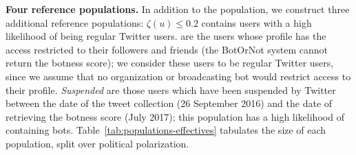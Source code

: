 

\textbf{Four reference populations.}
In addition to the \Bot population, we construct three additional reference populations:
\Human $\zeta(u) \leq 0.2$ contains users with a high likelihood of being regular Twitter users.
\Protected are the users whose profile has the access restricted to their followers and friends (the BotOrNot system cannot return the botness score); we consider these users to be regular Twitter users, since we assume that no organization or broadcasting bot would restrict access to their profile.
\emph{Suspended} are those users which have been suspended by Twitter between the date of the tweet collection (26 September 2016) and the date of retrieving the botness score (July 2017);
this population has a high likelihood of containing bots.
Table~\ref{tab:populations-effectives} tabulates the size of each population, split over  political polarization.
